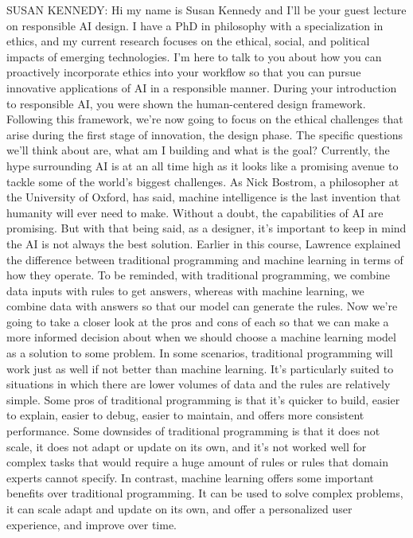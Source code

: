 SUSAN KENNEDY: Hi my name is Susan Kennedy
and I'll be your guest lecture on responsible AI design.
I have a PhD in philosophy with a specialization in ethics,
and my current research focuses on the ethical, social, and political impacts
of emerging technologies.
I'm here to talk to you about how you can proactively incorporate ethics
into your workflow so that you can pursue innovative applications of AI
in a responsible manner.
During your introduction to responsible AI,
you were shown the human-centered design framework.
Following this framework, we're now going
to focus on the ethical challenges that arise
during the first stage of innovation, the design phase.
The specific questions we'll think about are, what am I building
and what is the goal?
Currently, the hype surrounding AI is at an all time high
as it looks like a promising avenue to tackle
some of the world's biggest challenges.
As Nick Bostrom, a philosopher at the University of Oxford, has said,
machine intelligence is the last invention
that humanity will ever need to make.
Without a doubt, the capabilities of AI are promising.
But with that being said, as a designer, it's important to keep in mind
the AI is not always the best solution.
Earlier in this course, Lawrence explained the difference
between traditional programming and machine
learning in terms of how they operate.
To be reminded, with traditional programming,
we combine data inputs with rules to get answers, whereas with machine learning,
we combine data with answers so that our model can generate the rules.
Now we're going to take a closer look at the pros and cons of each
so that we can make a more informed decision about when
we should choose a machine learning model as a solution to some problem.
In some scenarios, traditional programming
will work just as well if not better than machine learning.
It's particularly suited to situations in which there
are lower volumes of data and the rules are relatively simple.
Some pros of traditional programming is that it's quicker
to build, easier to explain, easier to debug, easier to maintain,
and offers more consistent performance.
Some downsides of traditional programming is that it does not scale,
it does not adapt or update on its own, and it's not worked well for complex
tasks that would require a huge amount of rules or rules that domain experts
cannot specify.
In contrast, machine learning offers some important benefits
over traditional programming.
It can be used to solve complex problems,
it can scale adapt and update on its own,
and offer a personalized user experience, and improve over time.
